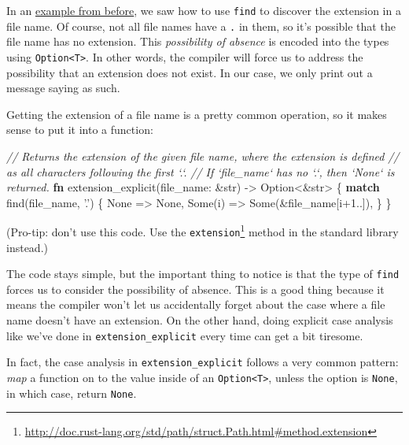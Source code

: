 \documentclass[a4paper,]{book}
\newenvironment{Shaded}{\begin{snugshade}}{\end{snugshade}}
\newcommand{\KeywordTok}[1]{\textcolor[rgb]{0.13,0.29,0.53}{\textbf{{#1}}}}
\newcommand{\DataTypeTok}[1]{\textcolor[rgb]{0.13,0.29,0.53}{{#1}}}
\newcommand{\DecValTok}[1]{\textcolor[rgb]{0.00,0.00,0.81}{{#1}}}
\newcommand{\ConstantTok}[1]{\textcolor[rgb]{0.00,0.00,0.00}{{#1}}}
\newcommand{\CharTok}[1]{\textcolor[rgb]{0.31,0.60,0.02}{{#1}}}
\newcommand{\CommentTok}[1]{\textcolor[rgb]{0.56,0.35,0.01}{\textit{{#1}}}}
\newcommand{\NormalTok}[1]{{#1}}
\renewcommand{\href}[2]{#2\footnote{\url{#1}}}
\begin{document}
In an \protect\hyperlink{code-option-ex-string-find}{example from
before}, we saw how to use \texttt{find} to discover the extension in a
file name. Of course, not all file names have a \texttt{.} in them, so
it's possible that the file name has no extension. This
\emph{possibility of absence} is encoded into the types using
\texttt{Option\textless{}T\textgreater{}}. In other words, the compiler
will force us to address the possibility that an extension does not
exist. In our case, we only print out a message saying as such.

Getting the extension of a file name is a pretty common operation, so it
makes sense to put it into a function:

\begin{Shaded}
\begin{Highlighting}[]
\CommentTok{// Returns the extension of the given file name, where the extension is defined}
\CommentTok{// as all characters following the first `.`.}
\CommentTok{// If `file_name` has no `.`, then `None` is returned.}
\KeywordTok{fn} \NormalTok{extension_explicit(file_name: &}\DataTypeTok{str}\NormalTok{) -> }\DataTypeTok{Option}\NormalTok{<&}\DataTypeTok{str}\NormalTok{> \{}
    \KeywordTok{match} \NormalTok{find(file_name, }\CharTok{'.'}\NormalTok{) \{}
        \ConstantTok{None} \NormalTok{=> }\ConstantTok{None}\NormalTok{,}
        \ConstantTok{Some}\NormalTok{(i) => }\ConstantTok{Some}\NormalTok{(&file_name[i+}\DecValTok{1.}\NormalTok{.]),}
    \NormalTok{\}}
\NormalTok{\}}
\end{Highlighting}
\end{Shaded}

(Pro-tip: don't use this code. Use the
\href{http://doc.rust-lang.org/std/path/struct.Path.html\#method.extension}{\texttt{extension}}
method in the standard library instead.)

The code stays simple, but the important thing to notice is that the
type of \texttt{find} forces us to consider the possibility of absence.
This is a good thing because it means the compiler won't let us
accidentally forget about the case where a file name doesn't have an
extension. On the other hand, doing explicit case analysis like we've
done in \texttt{extension\_explicit} every time can get a bit tiresome.

In fact, the case analysis in \texttt{extension\_explicit} follows a
very common pattern: \emph{map} a function on to the value inside of an
\texttt{Option\textless{}T\textgreater{}}, unless the option is
\texttt{None}, in which case, return \texttt{None}.
\end{document}

